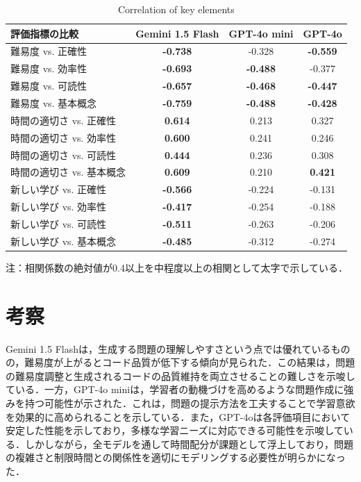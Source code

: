 \documentclass[twocolumn, fleqn, uplatex]{jsarticle}
\begin{document}
\begin{table}[t]
\centering
\scriptsize
\caption{Correlation of key elements}
\label{tab:correlation_results_focused}
\begin{threeparttable}
\begin{tabular}{lccc}
\hline
評価指標の比較 & Gemini 1.5 Flash & GPT-4o mini & GPT-4o \\
\hline
難易度 vs. 正確性 & \textbf{-0.738} & -0.328 & \textbf{-0.559} \\
難易度 vs. 効率性 & \textbf{-0.693} & \textbf{-0.488} & -0.377 \\
難易度 vs. 可読性 & \textbf{-0.657} & \textbf{-0.468} & \textbf{-0.447} \\
難易度 vs. 基本概念 & \textbf{-0.759} & \textbf{-0.488} & \textbf{-0.428} \\
\hline
時間の適切さ vs. 正確性 & \textbf{0.614} & 0.213 & 0.327 \\
時間の適切さ vs. 効率性 & \textbf{0.600} & 0.241 & 0.246 \\
時間の適切さ vs. 可読性 & \textbf{0.444} & 0.236 & 0.308 \\
時間の適切さ vs. 基本概念 & \textbf{0.609} & 0.210 & \textbf{0.421} \\
\hline
新しい学び vs. 正確性 & \textbf{-0.566} & -0.224 & -0.131 \\
新しい学び vs. 効率性 & \textbf{-0.417} & -0.254 & -0.188 \\
新しい学び vs. 可読性 & \textbf{-0.511} & -0.263 & -0.206 \\
新しい学び vs. 基本概念 & \textbf{-0.485} & -0.312 & -0.274 \\
\hline
\end{tabular}
\begin{tablenotes}
\small
\item 注：相関係数の絶対値が0.4以上を中程度以上の相関として太字で示している．
\end{tablenotes}
\end{threeparttable}
\end{table}
\section{考察}
Gemini 1.5 Flashは，生成する問題の理解しやすさという点では優れているものの，難易度が上がるとコード品質が低下する傾向が見られた．この結果は，問題の難易度調整と生成されるコードの品質維持を両立させることの難しさを示唆している．一方，GPT-4o miniは，学習者の動機づけを高めるような問題作成に強みを持つ可能性が示された．これは，問題の提示方法を工夫することで学習意欲を効果的に高められることを示している．また，GPT-4oは各評価項目において安定した性能を示しており，多様な学習ニーズに対応できる可能性を示唆している．しかしながら，全モデルを通して時間配分が課題として浮上しており，問題の複雑さと制限時間との関係性を適切にモデリングする必要性が明らかになった．
\end{document}
